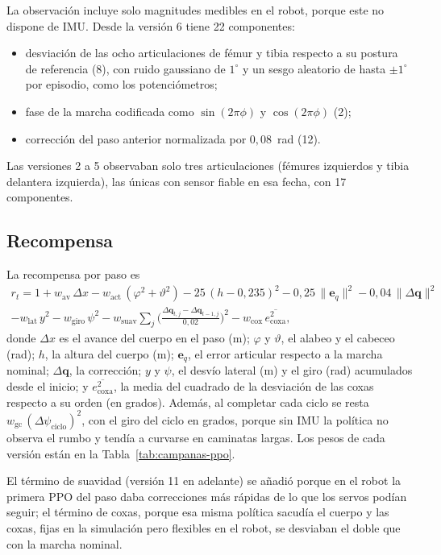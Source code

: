 La observación incluye solo magnitudes medibles en el robot, porque este no
dispone de IMU. Desde la versión 6 tiene 22 componentes:
\begin{itemize}
    \item desviación de las ocho articulaciones de fémur y tibia respecto a su
    postura de referencia (8), con ruido gaussiano de $1^\circ$ y un sesgo
    aleatorio de hasta $\pm1^\circ$ por episodio, como los potenciómetros;
    \item fase de la marcha codificada como $\sin(2\pi\phi)$ y $\cos(2\pi\phi)$ (2);
    \item corrección del paso anterior normalizada por $0{,}08$~rad (12).
\end{itemize}
Las versiones 2 a 5 observaban solo tres articulaciones (fémures izquierdos y
tibia delantera izquierda), las únicas con sensor fiable en esa fecha, con 17
componentes.

\subsection{Recompensa}

La recompensa por paso es
\begin{multline}
    r_t = 1 + w_{\text{av}}\,\Delta x - w_{\text{act}}\,(\varphi^2+\vartheta^2)
    - 25\,(h-0{,}235)^2 - 0{,}25\,\lVert\mathbf{e}_q\rVert^2 - 0{,}04\,\lVert\Delta\mathbf{q}\rVert^2 \\
    - w_{\text{lat}}\,y^2 - w_{\text{giro}}\,\psi^2
    - w_{\text{suav}}\sum_j\Big(\frac{\Delta\mathbf{q}_{t,j}-\Delta\mathbf{q}_{t-1,j}}{0{,}02}\Big)^2
    - w_{\text{cox}}\,\overline{e_{\text{coxa}}^2},
    \label{eq:recompensa-real}
\end{multline}
donde $\Delta x$ es el avance del cuerpo en el paso (m); $\varphi$ y $\vartheta$,
el alabeo y el cabeceo (rad); $h$, la altura del cuerpo (m); $\mathbf{e}_q$, el
error articular respecto a la marcha nominal; $\Delta\mathbf{q}$, la corrección;
$y$ y $\psi$, el desvío lateral (m) y el giro (rad) acumulados desde el inicio;
y $\overline{e_{\text{coxa}}^2}$, la media del cuadrado de la desviación de las
coxas respecto a su orden (en grados). Además, al completar cada ciclo se resta
$w_{\text{gc}}\,(\Delta\psi_{\text{ciclo}})^2$, con el giro del ciclo en grados,
porque sin IMU la política no observa el rumbo y tendía a curvarse en caminatas
largas. Los pesos de cada versión están en la Tabla~\ref{tab:campanas-ppo}.

El término de suavidad (versión 11 en adelante) se añadió porque en el robot la
primera PPO del paso daba correcciones más rápidas de lo que los servos podían
seguir; el término de coxas, porque esa misma política sacudía el cuerpo y las
coxas, fijas en la simulación pero flexibles en el robot, se desviaban el doble
que con la marcha nominal.

